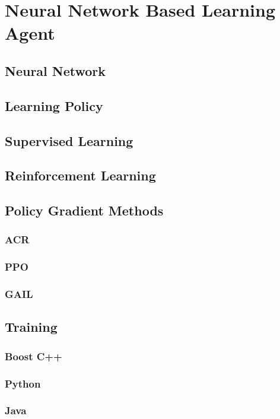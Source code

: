 \chapter{Neural Network Based Learning Agent}
\label{chap:6}

\section{Neural Network}
\section{Learning Policy}
\section{Supervised Learning}
\section{Reinforcement Learning}
\section{Policy Gradient Methods}
\subsection{ACR}
\subsection{PPO}
\subsection{GAIL}
\section{Training}
\subsection{Boost C++}
\subsection{Python}
\subsection{Java}
